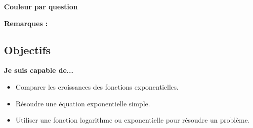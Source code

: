 {\begin{spacing}{1.2}
		\vspace{0.3cm}
		\begin{center}
			\textbf{Couleur par question} \\[0.3cm]
			\drawQcircles
		\end{center}
		\vspace{0.3cm}

		\tcbline

		\textbf{Remarques : } \\

		\endtcolorbox
	\end{spacing}
}

\vfill
{ \small
	\tcolorbox[colframe=black, colback=white, boxrule=1pt, width=\textwidth]
	\subsection*{Objectifs}

	\textbf{Je suis capable de...}
	\begin{itemize}[label={\bfseries \checkboxEmpty}]
		\item Comparer les croissances des fonctions exponentielles.
		\item Résoudre une équation exponentielle simple.
		\item Utiliser une fonction logarithme ou exponentielle pour résoudre un problème.
	\end{itemize}

	\endtcolorbox
}
\vfill
